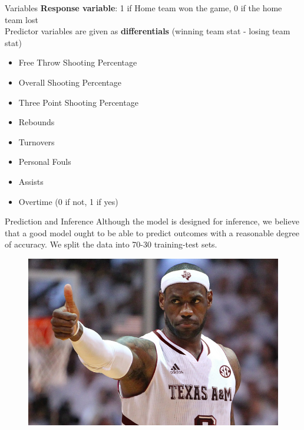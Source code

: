 \documentclass{beamer}
\begin{document}
\begin{frame}{Variables}
\textbf{Response variable}: 1 if Home team won the game, 0 if the home team lost\\
Predictor variables are given as \textbf{differentials} (winning team stat - losing team stat) 

	\begin{multicols}{2}
		
	\begin{itemize}
		\item Free Throw Shooting Percentage
		\item Overall Shooting Percentage
		\item Three Point Shooting Percentage
		\item Rebounds
		\item Turnovers
		\item Personal Fouls
		\item Assists
		\item Overtime (0 if not, 1 if yes)
	\end{itemize}
	
\end{multicols}


\end{frame}

\begin{frame}{Prediction and Inference} 
Although the model is designed for inference, we believe that a good model ought to be able to predict outcomes with a reasonable degree of accuracy. We split the data into 70-30 training-test sets. 
\begin{figure}[r]
	\includegraphics[height = .5\textheight]{fakelebron.png}
\end{figure}
\end{frame}
\end{document}

